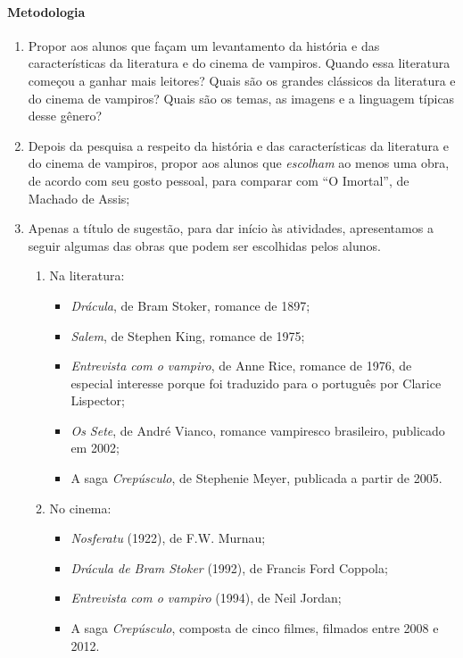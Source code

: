\documentclass{extarticle}
\begin{document}
\paragraph{Metodologia}
\begin{enumerate}
\item Propor aos alunos que façam um levantamento da história e das
características da literatura e do cinema de vampiros. Quando essa
literatura começou a ganhar mais leitores? Quais são os grandes
clássicos da literatura e do cinema de vampiros? Quais são os temas, as
imagens e a linguagem típicas desse gênero?

\item Depois da pesquisa a respeito da história e das características da
literatura e do cinema de vampiros, propor aos alunos que
\emph{escolham} ao menos uma obra, de acordo com seu gosto pessoal, para
comparar com ``O Imortal'', de Machado de Assis;

\item Apenas a título de sugestão, para dar início às atividades,
apresentamos a seguir algumas das obras que podem ser escolhidas pelos
alunos.

\begin{enumerate}
\item Na literatura:

\begin{itemize}
\item \emph{Drácula}, de Bram Stoker, romance de 1897; 

\item \emph{Salem}, de Stephen King, romance de 1975; 

\item \emph{Entrevista com o vampiro}, de Anne Rice, romance de 1976, de especial interesse porque foi traduzido para o português por Clarice Lispector; 

\item \emph{Os Sete}, de André Vianco, romance vampiresco brasileiro, publicado em 2002; 

\item A saga \emph{Crepúsculo}, de Stephenie Meyer, publicada a partir de 2005.
\end{itemize}

\item No cinema: 
\begin{itemize}
\item \emph{Nosferatu} (1922), de F.W. Murnau; 

\item \emph{Drácula de Bram Stoker} (1992), de Francis Ford Coppola; 

\item \emph{Entrevista com o vampiro} (1994), de Neil Jordan; 

\item A saga \emph{Crepúsculo}, composta de cinco filmes, filmados entre 2008 e 2012.
\end{itemize}
\end{enumerate}
\end{enumerate}
\end{document}
